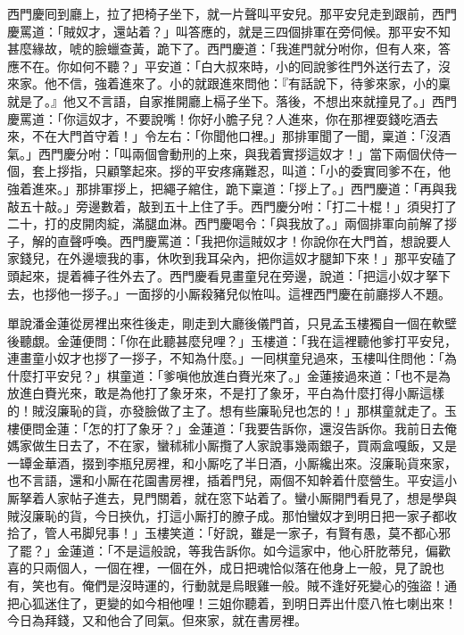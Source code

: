 西門慶囘到廳上，拉了把椅子坐下，就一片聲叫平安兒。那平安兒走到跟前，西門慶罵道：「賊奴才，還站着？」叫答應的，就是三四個排軍在旁伺候。那平安不知甚麼緣故，唬的臉蠟查黃，跪下了。西門慶道：「我進門就分咐你，但有人來，答應不在。你如何不聽？」平安道：「白大叔來時，小的囘說爹徃門外送行去了，沒來家。他不信，強着進來了。小的就跟進來問他：『有話說下，待爹來家，小的稟就是了。』他又不言語，自家推開廳上槅子坐下。落後，不想出來就撞見了。」西門慶罵道：「你這奴才，不要說嘴！你好小膽子兒？人進來，你在那裡耍錢吃酒去來，不在大門首守着！」令左右：「你聞他口裡。」那排軍聞了一聞，稟道：「沒酒氣。」西門慶分咐：「叫兩個會動刑的上來，與我着實拶這奴才！」當下兩個伏侍一個，套上拶指，只顧擎起來。拶的平安疼痛難忍，叫道：「小的委實囘爹不在，他強着進來。」那排軍拶上，把繩子綰住，跪下稟道：「拶上了。」西門慶道：「再與我敲五十敲。」旁邊數着，敲到五十上住了手。西門慶分咐：「打二十棍！」須臾打了二十，打的皮開肉綻，滿腿血淋。西門慶喝令：「與我放了。」兩個排軍向前解了拶子，解的直聲呼喚。西門慶罵道：「我把你這賊奴才！你說你在大門首，想說要人家錢兒，在外邊壞我的事，休吹到我耳朵內，把你這奴才腿卸下來！」那平安磕了頭起來，提着褲子徃外去了。西門慶看見畫童兒在旁邊，說道：「把這小奴才拏下去，也拶他一拶子。」一面拶的小厮殺豬兒似恠叫。這裡西門慶在前廳拶人不題。

單說潘金蓮從房裡出來徃後走，剛走到大廳後儀門首，只見孟玉樓獨自一個在軟壁後聽覷。金蓮便問：「你在此聽甚麼兒哩？」玉樓道：「我在這裡聽他爹打平安兒，連畫童小奴才也拶了一拶子，不知為什麼。」一囘棋童兒過來，玉樓叫住問他：「為什麼打平安兒？」棋童道：「爹嗔他放進白賚光來了。」金蓮接過來道：「也不是為放進白賚光來，敢是為他打了象牙來，不是打了象牙，平白為什麼打得小厮這樣的！賊沒廉恥的貨，亦發臉做了主了。想有些廉恥兒也怎的！」那棋童就走了。玉樓便問金蓮：「怎的打了象牙？」金蓮道：「我要告訴你，還沒告訴你。我前日去俺媽家做生日去了，不在家，蠻秫秫小厮攬了人家說事幾兩銀子，買兩盒嘎飯，又是一罈金華酒，掇到李瓶兒房裡，和小厮吃了半日酒，小厮纔出來。沒廉恥貨來家，也不言語，還和小厮在花園書房裡，插着門兒，兩個不知幹着什麼營生。平安這小厮拏着人家帖子進去，見門關着，就在窓下站着了。蠻小厮開門看見了，想是學與賊沒廉恥的貨，今日挾仇，打這小厮打的膫子成。那怕蠻奴才到明日把一家子都收拾了，管人弔脚兒事！」玉樓笑道：「好說，雖是一家子，有賢有愚，{}莫不都心邪了罷？」金蓮道：「不是這般說，等我告訴你。如今這家中，他心肝肐蒂兒，偏歡喜的只兩個人，一個在裡，一個在外，成日把魂恰似落在他身上一般，見了說也有，笑也有。俺們是沒時運的，行動就是烏眼雞一般。賊不逢好死變心的強盜！通把心狐迷住了，更變的如今相他哩！三姐你聽着，到明日弄出什麼八恠七喇出來！今日為拜錢，又和他合了囘氣。但來家，就在書房裡。

